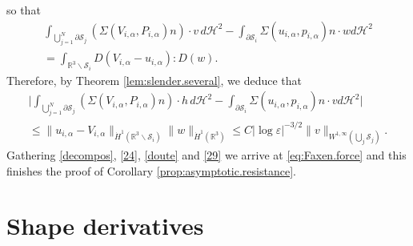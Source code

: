 \documentclass[10pt]{amsart}
\newcommand{\R}{\mathbb{R}}
\let\eps\varepsilon
\theoremstyle{definition}
\theoremstyle{remark}
\let\oldbigcup\bigcup
\begin{document}
so that
\begin{multline*}
\int_{\oldbigcup_{j=1}^N \partial \mathcal S_j} (\Sigma (V_{i,\alpha}, P_{i,\alpha}) n) \cdot v \, d\mathcal{H}^2
- \int_{\partial \mathcal S_i} \Sigma (u_{i,\alpha}, p_{i,\alpha}) n \cdot w {d\mathcal{H}^2}
\\[-8pt]
=\int_{\R^3 \smallsetminus \mathcal S_i } D(V_{i,\alpha} - u_{i,\alpha}) : D(w).
\end{multline*}
Therefore, by Theorem \ref{lem:slender.several}, we deduce that
\begin{multline}\label{29}
\biggl| \int_{\oldbigcup_{j=1}^N \partial \mathcal S_j} (\Sigma (V_{i,\alpha}, P_{i,\alpha}) n) \cdot h \, d\mathcal{H}^2
- \int_{\partial \mathcal S_i} \Sigma (u_{i,\alpha}, p_{i,\alpha}) n \cdot v {d\mathcal{H}^2}
\biggr| \\
\leq
\| u_{i,\alpha} - V_{i,\alpha}\|_{\dot H^1(\R^3 \smallsetminus \mathcal S_i)} \|w\|_{\dot H^1(\R^3)}
\leq C \left|\log \eps\right|^{-3/2} \|v\|_{W^{1,\infty}{(\oldbigcup_{j}\mathcal S_j)}}.
\end{multline}
Gathering
\eqref{decompos}, \eqref{24},
\eqref{doute}
and \eqref{29} we arrive at
\eqref{eq:Faxen.force} and
this finishes the proof of Corollary \ref{prop:asymptotic.resistance}.

\section{Shape derivatives}
\label{shape-derivative}
\end{document}

